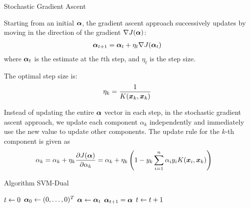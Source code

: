 \begin{frame}{Stochastic Gradient Ascent}

  Starting from an initial ${\bm \alpha}$, the
gradient ascent approach successively updates by moving in the direction
of the gradient $\nabla J({\bm \alpha})$:
\begin{align*}
    {\bm \alpha}_{t+1} = {\bm \alpha}_t + \eta_t \nabla J({\bm \alpha}_t)
\end{align*}
where ${\bm \alpha}_t$ is the estimate at the $t$th step, and $\eta_t$ is the
step size. 

\medskip
The optimal step size is:
\begin{align*}
    \eta_k = {1 \over K({\boldsymbol x}_k, {\boldsymbol x}_k)}
\end{align*}

\medskip
Instead of updating the entire ${\bm \alpha}$ vector in each step, in
the stochastic gradient ascent approach, we update each component $\alpha_k$ independently and immediately
use the new value to update other components. 
The update rule for the $k$-th component
is given as
\begin{align*}
    \alpha_{k} & = \alpha_{k} + \eta_{k}
    \dfrac{\partial J({\bm \alpha})}{\partial \alpha_k}
    = \alpha_{k} + \eta_{k}
    \left(1 - y_k\displaystyle \sum_{i=1}^n \alpha_i y_i K({\boldsymbol x}_i,{\boldsymbol x}_k)
    \right)
\end{align*}
\end{frame}



\begin{frame}[fragile]{Algorithm \textsc SVM-Dual}
\begin{footnotesize}
\begin{tightalgo}[H]{\textwidth-18pt}
\Algorithm{} 
$t \leftarrow 0$\; 
${\bm \alpha}_0 \leftarrow (0, \ldots, 0)^T$\;
 {%
${\bm \alpha} \leftarrow {\bm \alpha}_t$\;
%
${\bm \alpha}_{t+1} = {\bm \alpha}$\;
$t \leftarrow t+1$\;
}%
\end{tightalgo}
\end{footnotesize}
\end{frame}




